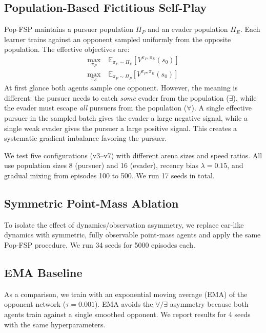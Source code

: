 \documentclass[letterpaper, 10pt, journal]{IEEEtran}
\begin{document}
\subsection{Population-Based Fictitious Self-Play}
\label{subsec:pop_fsp}

Pop-FSP maintains a pursuer population $\Pi_P$ and an evader population $\Pi_E$. Each learner trains against an opponent sampled uniformly from the opposite population. The effective objectives are:
\begin{align}
\max_{\pi_P} \; & \mathbb{E}_{\pi_E \sim \Pi_E} [ V^{\pi_P, \pi_E}(s_0) ] \label{eq:pursuer} \\
\max_{\pi_E} \; & \mathbb{E}_{\pi_P \sim \Pi_P} [ V^{\pi_P, \pi_E}(s_0) ] \label{eq:evader}
\end{align}
At first glance both agents sample one opponent. However, the meaning is different: the pursuer needs to catch \emph{some} evader from the population ($\exists$), while the evader must escape \emph{all} pursuers from the population ($\forall$). A single effective pursuer in the sampled batch gives the evader a large negative signal, while a single weak evader gives the pursuer a large positive signal. This creates a systematic gradient imbalance favoring the pursuer.

We test five configurations (v3--v7) with different arena sizes and speed ratios. All use population sizes 8 (pursuer) and 16 (evader), recency bias $\lambda=0.15$, and gradual mixing from episodes 100 to 500. We run 17 seeds in total.

\subsection{Symmetric Point-Mass Ablation}
\label{subsec:symmetric}

To isolate the effect of dynamics/observation asymmetry, we replace car-like dynamics with symmetric, fully observable point-mass agents and apply the same Pop-FSP procedure. We run 34 seeds for 5000 episodes each.

\subsection{EMA Baseline}
\label{subsec:ema}

As a comparison, we train with an exponential moving average (EMA) of the opponent network ($\tau=0.001$). EMA avoids the $\forall/\exists$ asymmetry because both agents train against a single smoothed opponent. We report results for 4 seeds with the same hyperparameters.
\end{document}
